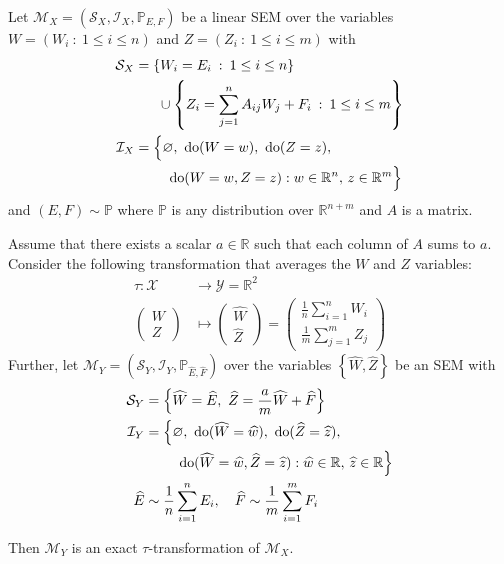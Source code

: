 \begin{theorem}\label{theorem:micro-macro}
Let ${\mathcal{M}_X = \left(\mathcal{S}_X, \mathcal{I}_X, \mathbb{P}_{E,F} \right)}$ be a linear SEM over the variables ${W=\left( W_i \: : \: 1\leq  i \leq n \right)}$ and ${Z=\left( Z_i \: : \: 1\leq  i \leq m \right)}$ with
%
\begin{align*}
\mathcal{S}_X &= \left\lbrace W_i = E_i \:  : \: 1 \leq i \leq n  \right\rbrace \\
& \quad \ \  \cup \left\lbrace Z_i = \sum_{j=1}^n A_{ij}W_j  + F_{i} \:  : \: 1\leq i \leq m \right\rbrace \\
%
\mathcal{I}_X &= \Big{\{} \nulli, \ \doop(W= w), \ \doop(Z= z), \\
& \qquad\ \doop(W= w, Z= z ) :   w \in \mathbb{R}^{n}, \, z \in \mathbb{R}^m \Big{\}}
%
\end{align*}
%
and $(E,F)  \sim \mathbb{P}$ where $\mathbb{P}$ is any distribution over $\mathbb{R}^{n+m}$ and $A$ is a matrix.

Assume that there exists a scalar $a\in \mathbb{R}$ such that each column of $A$ sums to $a$. Consider the following transformation that averages the $W$ and $Z$ variables:
%
\begin{align*}
\tau : \mathcal{X} &\rightarrow \mathcal{Y} = \mathbb{R}^2 \\
\begin{pmatrix} W \\ Z \end{pmatrix} &\mapsto \begin{pmatrix} \widehat{W} \\ \widehat{Z} \end{pmatrix} = \begin{pmatrix} \frac{1}{n}\sum_{i=1}^n W_i \\ \frac{1}{m}\sum_{j=1}^m Z_j  \end{pmatrix}
\end{align*}
%
Further, let $\mathcal{M}_Y = \left(\mathcal{S}_Y, \mathcal{I}_Y, \mathbb{P}_{\widehat{E},\widehat{F}} \right)$ over the variables ${\left\lbrace \widehat{W}, \widehat{Z} \right\rbrace}$ be an SEM with
%
\begin{align*}
\mathcal{S}_Y &= \Big\lbrace \widehat{W} = \widehat{E}, \ \widehat{Z} = \frac{a}{m}\widehat{W} + \widehat{F} \Big\rbrace \\
%
\mathcal{I}_Y &= \Big{\{} \nulli,\ \doop(\widehat{W}= \widehat{w}), \ \doop(\widehat{Z}= \widehat{z}), \\
& \qquad\ \doop(\widehat{W}= \widehat{w}, \widehat{Z}= \widehat{z} ) :   \widehat{w} \in \mathbb{R}, \, \widehat{z} \in \mathbb{R} \Big{\}} \\
%
\widehat{E}  & \sim \frac{1}{n}\sum_{i=1}^{n} E_i, \quad
\widehat{F}  \sim \frac{1}{m}\sum_{i=1}^{m} F_i
\end{align*}

Then $\mathcal{M}_Y$ is an exact $\tau$-transformation of $\mathcal{M}_X$.
\end{theorem}

